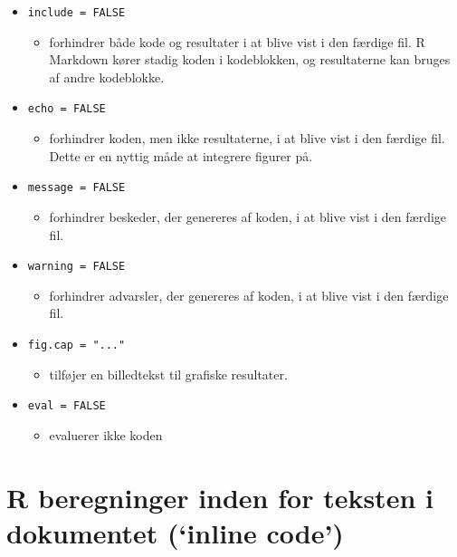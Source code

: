 \documentclass[
]{book}
\providecommand{\tightlist}{%
  \setlength{\itemsep}{0pt}\setlength{\parskip}{0pt}}
\begin{document}
\begin{itemize}
\tightlist
\item
  \texttt{include\ =\ FALSE}

  \begin{itemize}
  \tightlist
  \item
    forhindrer både kode og resultater i at blive vist i den færdige fil. R Markdown kører stadig koden i kodeblokken, og resultaterne kan bruges af andre kodeblokke.
  \end{itemize}
\item
  \texttt{echo\ =\ FALSE}

  \begin{itemize}
  \tightlist
  \item
    forhindrer koden, men ikke resultaterne, i at blive vist i den færdige fil. Dette er en nyttig måde at integrere figurer på.
  \end{itemize}
\item
  \texttt{message\ =\ FALSE}

  \begin{itemize}
  \tightlist
  \item
    forhindrer beskeder, der genereres af koden, i at blive vist i den færdige fil.
  \end{itemize}
\item
  \texttt{warning\ =\ FALSE}

  \begin{itemize}
  \tightlist
  \item
    forhindrer advarsler, der genereres af koden, i at blive vist i den færdige fil.
  \end{itemize}
\item
  \texttt{fig.cap\ =\ "..."}

  \begin{itemize}
  \tightlist
  \item
    tilføjer en billedtekst til grafiske resultater.
  \end{itemize}
\item
  \texttt{eval\ =\ FALSE}

  \begin{itemize}
  \tightlist
  \item
    evaluerer ikke koden
  \end{itemize}
\end{itemize}

\section{R beregninger inden for teksten i dokumentet (`inline code')}\label{r-beregninger-inden-for-teksten-i-dokumentet-inline-code}
\end{document}
